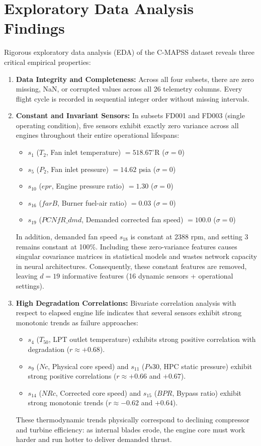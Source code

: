 \documentclass[12pt,a4paper,oneside]{report}
\begin{document}
\section{Exploratory Data Analysis Findings}
Rigorous exploratory data analysis (EDA) of the C-MAPSS dataset reveals three critical empirical properties:
\begin{enumerate}
    \item \textbf{Data Integrity and Completeness:} Across all four subsets, there are zero missing, NaN, or corrupted values across all 26 telemetry columns. Every flight cycle is recorded in sequential integer order without missing intervals.
    \item \textbf{Constant and Invariant Sensors:} In subsets FD001 and FD003 (single operating condition), five sensors exhibit exactly zero variance across all engines throughout their entire operational lifespans:
    \begin{itemize}
        \item $s_1$ ($T_2$, Fan inlet temperature) $= 518.67^\circ$R ($\sigma = 0$)
        \item $s_5$ ($P_2$, Fan inlet pressure) $= 14.62$ psia ($\sigma = 0$)
        \item $s_{10}$ ($epr$, Engine pressure ratio) $= 1.30$ ($\sigma = 0$)
        \item $s_{16}$ ($farB$, Burner fuel-air ratio) $= 0.03$ ($\sigma = 0$)
        \item $s_{19}$ ($PCNfR\_dmd$, Demanded corrected fan speed) $= 100.0$ ($\sigma = 0$)
    \end{itemize}
    In addition, demanded fan speed $s_{18}$ is constant at 2388 rpm, and setting 3 remains constant at 100\%. Including these zero-variance features causes singular covariance matrices in statistical models and wastes network capacity in neural architectures. Consequently, these constant features are removed, leaving $d = 19$ informative features (16 dynamic sensors + operational settings).
    \item \textbf{High Degradation Correlations:} Bivariate correlation analysis with respect to elapsed engine life indicates that several sensors exhibit strong monotonic trends as failure approaches:
    \begin{itemize}
        \item $s_4$ ($T_{50}$, LPT outlet temperature) exhibits strong positive correlation with degradation ($r \approx +0.68$).
        \item $s_9$ ($Nc$, Physical core speed) and $s_{11}$ ($Ps30$, HPC static pressure) exhibit strong positive correlations ($r \approx +0.66$ and $+0.67$).
        \item $s_{14}$ ($NRc$, Corrected core speed) and $s_{15}$ ($BPR$, Bypass ratio) exhibit strong monotonic trends ($r \approx -0.62$ and $+0.64$).
    \end{itemize}
    These thermodynamic trends physically correspond to declining compressor and turbine efficiency: as internal blades erode, the engine core must work harder and run hotter to deliver demanded thrust.
\end{enumerate}
\end{document}
